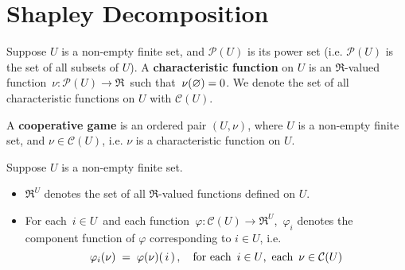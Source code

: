 

\section{Shapley Decomposition}
\setcounter{theorem}{0}
\setcounter{equation}{0}


\renewcommand{\theenumi}{\roman{enumi}}
\renewcommand{\labelenumi}{\textnormal{(\theenumi)}$\;\;$}


\begin{definition}
\mbox{}
\vskip 0.1cm
\noindent
Suppose $U$ is a non-empty finite set, and
$\mathcal{P}(U)$ is its power set
(i.e. $\mathcal{P}(U)$ is the set of all subsets of $U$).
A \textbf{characteristic function} on $U$ is an $\Re$-valued function
\,$\nu : \mathcal{P}(U) \longrightarrow \Re$\,
such that \,$\nu(\varnothing) = 0$.
We denote the set of all characteristic functions on $U$ with $\mathcal{C}(U)$.
\end{definition}

\begin{definition}
\mbox{}
\vskip 0.1cm
\noindent
A \textbf{cooperative game} is an ordered pair $(U,\nu)$,
where $U$ is a non-empty finite set, and $\nu \in \mathcal{C}(U)$,
i.e. $\nu$ is a characteristic function on $U$.
\end{definition}

\begin{notation}
\mbox{}
\vskip 0.1cm
\noindent
Suppose $U$ is a non-empty finite set.
\begin{itemize}
\item
	$\Re^{U}$ denotes the set of all $\Re$-valued functions defined on $U$.
\item
	For each \,$i \in U$\, and each function
	\,$\varphi : \mathcal{C}(U) \longrightarrow \Re^{U}$,\,
	$\varphi_{i}$ denotes the component function of $\varphi$ corresponding to $i \in U$, i.e.
	\begin{equation*}
	\varphi_{i}(\nu) \; = \; \varphi(\nu)(\,i\,)\,,
	\quad
	\textnormal{for each \,$i \in U$,\, each \,$\nu \in \mathcal{C}(U)$}
	\end{equation*}
\end{itemize}
\end{notation}

